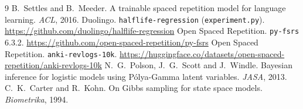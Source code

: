 \documentclass[11pt,a4paper]{article}
\begin{document}
\begin{thebibliography}{9}\small
{} B.~Settles and B.~Meeder. A trainable spaced repetition model for language learning. \emph{ACL}, 2016.
 Duolingo. \texttt{halflife-regression} (\texttt{experiment.py}). \url{https://github.com/duolingo/halflife-regression}
 Open Spaced Repetition. \texttt{py-fsrs} 6.3.2. \url{https://github.com/open-spaced-repetition/py-fsrs}
 Open Spaced Repetition. \texttt{anki-revlogs-10k}. \url{https://huggingface.co/datasets/open-spaced-repetition/anki-revlogs-10k}
 N.~G.~Polson, J.~G.~Scott and J.~Windle. Bayesian inference for logistic models using Pólya-Gamma latent variables. \emph{JASA}, 2013.
 C.~K.~Carter and R.~Kohn. On Gibbs sampling for state space models. \emph{Biometrika}, 1994.
\end{thebibliography}
\end{document}
